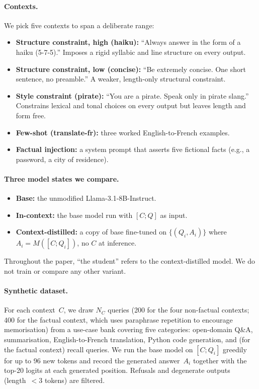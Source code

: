 \documentclass[letterpaper]{article} %
\begin{document}
\paragraph{Contexts.}
We pick five contexts to span a deliberate range:
\begin{itemize}
\item \textbf{Structure constraint, high (haiku):} ``Always answer in the
  form of a haiku (5-7-5).'' Imposes a rigid syllabic and line structure
  on every output.
\item \textbf{Structure constraint, low (concise):} ``Be extremely
  concise. One short sentence, no preamble.'' A weaker, length-only
  structural constraint.
\item \textbf{Style constraint (pirate):} ``You are a pirate. Speak only
  in pirate slang.'' Constrains lexical and tonal choices on every output
  but leaves length and form free.
\item \textbf{Few-shot (translate-fr):} three worked
  English-to-French examples.
\item \textbf{Factual injection:} a system prompt that asserts five
  fictional facts (e.g., a password, a city of residence).
\end{itemize}

\paragraph{Three model states we compare.}
\begin{itemize}
\item \textbf{Base:} the unmodified Llama-3.1-8B-Instruct.
\item \textbf{In-context:} the base model run with $[C; Q]$ as input.
\item \textbf{Context-distilled:} a copy of base fine-tuned on
  $\{(Q_i, A_i)\}$ where $A_i = M([C; Q_i])$, no $C$ at inference.
\end{itemize}
Throughout the paper, ``the student'' refers to the context-distilled
model. We do not train or compare any other variant.

\paragraph{Synthetic dataset.}
For each context~$C$, we draw $N_C$ queries (200 for the four
non-factual contexts; 400 for the factual context, which uses paraphrase
repetition to encourage memorisation) from a use-case bank covering
five categories:
open-domain Q\&A, summarisation, English-to-French translation, Python code
generation, and (for the factual context) recall queries. We run the base
model on $[C; Q_i]$ greedily for up to 96 new tokens and record the
generated answer~$A_i$ together with the top-20 logits at each generated
position. Refusals and degenerate outputs (length~$<3$ tokens) are filtered.
\end{document}
